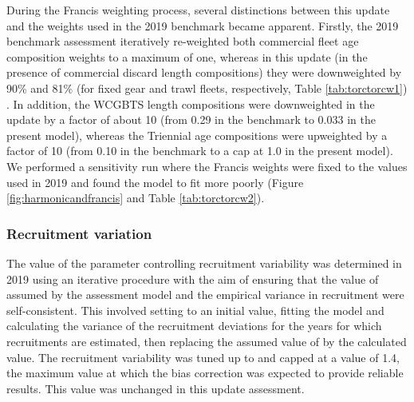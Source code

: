 \documentclass[11pt,
  english,
  a4paper,
]{article}
\begin{document}
\leavevmode\tagmcend\tagstructend\par


During the Francis weighting process, several distinctions between this update and the weights used in the 2019 benchmark became apparent. Firstly, the 2019 benchmark assessment iteratively re-weighted both commercial fleet age composition weights to a maximum of one, whereas in this update (in the presence of commercial discard length compositions) they were downweighted by 90\% and 81\% (for fixed gear and trawl fleets, respectively, Table \ref{tab:torctorcw1}) . In addition, the WCGBTS length compositions were downweighted in the update by a factor of about 10 (from 0.29 in the benchmark to 0.033 in the present model), whereas the Triennial age compositions were upweighted by a factor of 10 (from 0.10 in the benchmark to a cap at 1.0 in the present model). We performed a sensitivity run where the Francis weights were fixed to the values used in 2019 and found the model to fit more poorly (Figure \ref{fig:harmonicandfrancis} and Table \ref{tab:torctorcw2}).

\leavevmode\tagmcend\tagstructend\par


\hypertarget{recruitment-variation}{%
\subsubsection{Recruitment variation}\label{recruitment-variation}}

\leavevmode\tagmcend\tagstructend


The value of the parameter controlling recruitment variability was determined in 2019 using an iterative procedure with the aim of ensuring that the value of assumed by the assessment model and the empirical variance in recruitment were self-consistent. This involved setting to an initial value, fitting the model and calculating the variance of the recruitment deviations for the years for which recruitments are estimated, then replacing the assumed value of by the calculated value. The recruitment variability was tuned up to and capped at a value of 1.4, the maximum value at which the bias correction was expected to provide reliable results. This value was unchanged in this update assessment.
\end{document}
